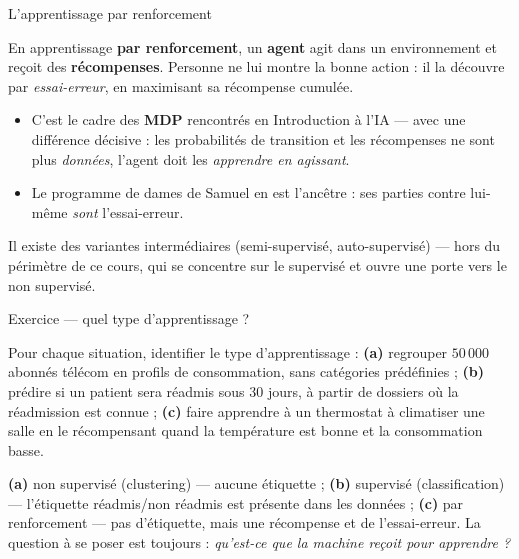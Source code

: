 \documentclass[aspectratio=169,11pt]{beamer}
\begin{document}
\begin{frame}{L'apprentissage par renforcement}
\begin{ucaddef}[Définition]
{\small En apprentissage \textbf{par renforcement}, un \textbf{agent} agit dans un environnement et reçoit des \textbf{récompenses}. Personne ne lui montre la bonne action : il la découvre par \emph{essai-erreur}, en maximisant sa récompense cumulée.}
\end{ucaddef}
\begin{itemize}\small
  \item C'est le cadre des \textbf{MDP} rencontrés en Introduction à l'IA — avec une différence décisive : les probabilités de transition et les récompenses ne sont plus \emph{données}, l'agent doit les \emph{apprendre en agissant}.
  \item Le programme de dames de Samuel en est l'ancêtre : ses parties contre lui-même \emph{sont} l'essai-erreur.
\end{itemize}
\begin{ucadfront}
{\small Il existe des variantes intermédiaires (semi-supervisé, auto-supervisé) — hors du périmètre de ce cours, qui se concentre sur le supervisé et ouvre une porte vers le non supervisé.}
\end{ucadfront}
\end{frame}

\begin{frame}{Exercice — quel type d'apprentissage ?}
\begin{ucadrec}[Énoncé]
{\small Pour chaque situation, identifier le type d'apprentissage : \textbf{(a)} regrouper $50\,000$ abonnés télécom en profils de consommation, sans catégories prédéfinies ; \textbf{(b)} prédire si un patient sera réadmis sous $30$ jours, à partir de dossiers où la réadmission est connue ; \textbf{(c)} faire apprendre à un thermostat à climatiser une salle en le récompensant quand la température est bonne et la consommation basse.}
\end{ucadrec}
\pause
\begin{ucadex}[Correction]
{\small \textbf{(a)} non supervisé (clustering) — aucune étiquette ; \textbf{(b)} supervisé (classification) — l'étiquette réadmis/non réadmis est présente dans les données ; \textbf{(c)} par renforcement — pas d'étiquette, mais une récompense et de l'essai-erreur. La question à se poser est toujours : \emph{qu'est-ce que la machine reçoit pour apprendre ?}}
\end{ucadex}
\end{frame}
\end{document}
